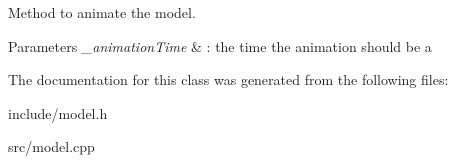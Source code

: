 Method to animate the model. 


\begin{DoxyParams}{Parameters}
{\em \+\_\+animation\+Time} & \+: the time the animation should be a \\
\hline
\end{DoxyParams}


The documentation for this class was generated from the following files\+:\begin{DoxyCompactItemize}
\item 
include/model.\+h\item 
src/model.\+cpp\end{DoxyCompactItemize}
